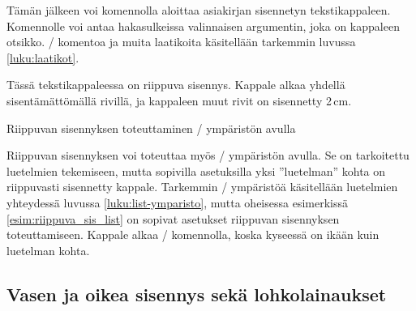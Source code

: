 \begin{koodilohkosis}
\newlength{\sarkain}
\setlength{\sarkain}{2.3cm}
\newcommand{\kappale}[1][]{\par\hangpara{2\sarkain}{1}%
  \makebox[2\sarkain][l]{\ignorespaces #1}\ignorespaces}
\end{koodilohkosis}

Tämän jälkeen voi komennolla  aloittaa asiakirjan
sisennetyn tekstikappaleen. Komennolle voi antaa hakasulkeissa
valinnaisen argumentin, joka on kappaleen otsikko. \-/
komentoa ja muita laatikoita käsitellään tarkemmin luvussa
\ref{luku:laatikot}.

\begin{esimerkki*}
  \komentoi{,}

\begin{koodilohko}
\begin{list}{}{
    \setlength{\leftmargin}{2cm}
    \setlength{\itemindent}{-2cm}
  }
\item Tässä tekstikappaleessa on riippuva sisennys. Kappale alkaa
  yhdellä sisentämättömällä rivillä, ja kappaleen muut rivit on
  sisennetty 2\,cm.
\end{list}
\end{koodilohko}
  \caption{Riippuvan sisennyksen toteuttaminen \-/
    ympäristön avulla}
  \label{esim:riippuva_sis_list}
\end{esimerkki*}

Riippuvan sisennyksen voi toteuttaa myös \-/ ympäristön
avulla. Se on tarkoitettu luetelmien tekemiseen, mutta sopivilla
asetuksilla yksi ''luetelman'' kohta on riippuvasti sisennetty kappale.
Tarkemmin \-/ ympäristöä käsitellään luetelmien
yhteydessä luvussa \ref{luku:list-ymparisto}, mutta oheisessa
esimerkissä \ref{esim:riippuva_sis_list} on sopivat asetukset riippuvan
sisennyksen toteuttamiseen. Kappale alkaa \-/ komennolla,
koska kyseessä on ikään kuin luetelman kohta.

\subsection{Vasen ja oikea sisennys sekä lohkolainaukset}
\label{luku:lohkolainaukset}

